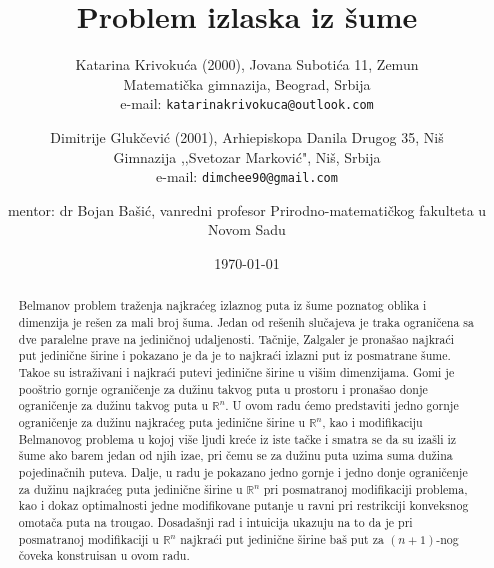 \documentclass[11pt,letter]{article}
\begin{document}
\title{\bf{Problem izlaska iz \v sume}}

\author{
Katarina Krivoku\'ca (2000), Jovana Suboti\' ca 11, Zemun \\
Matemati\v cka gimnazija, Beograd, Srbija\\
e-mail: \tt{katarinakrivokuca@outlook.com} \\
\and
Dimitrije Gluk\v cevi\' c (2001), Arhiepiskopa Danila Drugog 35, Ni\v s\\
Gimnazija ,,Svetozar Markovi\' c", Ni\v s, Srbija \\
e-mail: \tt{dimchee90@gmail.com} \\
\and
mentor: dr Bojan Ba\v si\' c, vanredni profesor Prirodno-matemati\v ckog fakulteta u Novom Sadu
}

\date{\today}
\maketitle %

\begin{abstract}
Belmanov problem tra\v zenja najkra\' ceg izlaznog puta iz \v sume poznatog oblika i dimenzija je re\v sen za mali broj \v suma. Jedan od re\v senih slu\v cajeva je traka ograni\v cena sa dve paralelne prave na jedini\v cnoj udaljenosti. Ta\v cnije, Zalgaler \cite{Zalgaller} je prona\v sao najkra\' ci put jedini\v cne \v sirine i pokazano je da je to najkra\' ci izlazni put iz posmatrane \v sume. Tako\dj e su istra\v zivani i najkra\' ci putevi \cite{Zalgaller3d} jedini\v cne \v sirine u vi\v sim dimenzijama. Gomi je \cite{Ghomi} poo\v strio gornje ograni\v cenje za du\v zinu takvog puta u prostoru i prona\v sao donje ograni\v cenje za du\v zinu takvog puta u $\mathbb{R}^n$. U ovom radu \' cemo predstaviti jedno gornje ograni\v cenje za du\v zinu najkra\' ceg puta jedini\v cne \v sirine u $\mathbb{R}^n$, kao i modifikaciju Belmanovog problema u kojoj vi\v se ljudi kre\' ce iz iste ta\v cke i smatra se da su iza\v sli iz \v sume ako barem jedan od njih iza\dj e, pri \v cemu se za du\v zinu puta uzima suma du\v zina pojedina\v cnih puteva. Dalje, u radu je pokazano jedno gornje i jedno donje ograni\v cenje za du\v zinu najkra\' ceg puta jedini\v cne \v sirine u $\mathbb{R}^n$ pri posmatranoj modifikaciji problema, kao i dokaz optimalnosti jedne modifikovane putanje u ravni pri restrikciji konveksnog omota\v ca puta na trougao. Dosada\v snji rad i intuicija ukazuju na to da je pri posmatranoj modifikaciji u $\mathbb{R}^n$ najkra\' ci put jedini\v cne \v sirine ba\v s put za $(n+1)$-nog \v coveka konstruisan u ovom radu.


\end{abstract}
\end{document}

